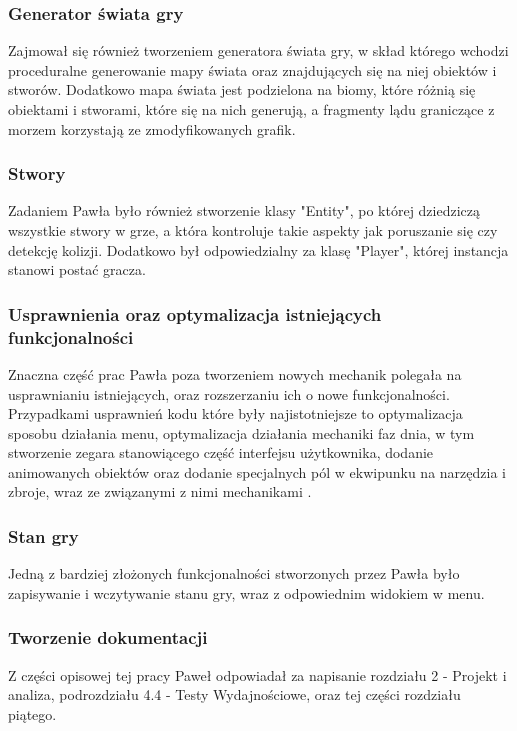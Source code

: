\documentclass{article}
\begin{document}
\subsubsection{Generator świata gry}
Zajmował się również tworzeniem generatora świata gry, w skład którego wchodzi proceduralne generowanie mapy świata oraz znajdujących się na niej obiektów i stworów. Dodatkowo mapa świata jest podzielona na biomy, które różnią się obiektami i stworami, które się na nich generują, a fragmenty lądu graniczące z morzem korzystają ze zmodyfikowanych grafik.

\subsubsection{Stwory}
Zadaniem Pawła było również stworzenie klasy "Entity", po której dziedziczą wszystkie stwory w grze, a która kontroluje takie aspekty jak poruszanie się czy detekcję kolizji. Dodatkowo był odpowiedzialny za klasę "Player", której instancja stanowi postać gracza.

\subsubsection{Usprawnienia oraz optymalizacja istniejących funkcjonalności}
Znaczna część prac Pawła poza tworzeniem nowych mechanik polegała na usprawnianiu istniejących, oraz rozszerzaniu ich o nowe funkcjonalności. Przypadkami usprawnień kodu które były najistotniejsze to optymalizacja sposobu działania menu, optymalizacja działania mechaniki faz dnia, w tym stworzenie zegara stanowiącego część interfejsu użytkownika, dodanie animowanych obiektów oraz dodanie specjalnych pól w ekwipunku na narzędzia i zbroje, wraz ze związanymi z nimi mechanikami .

\subsubsection{Stan gry}
Jedną z bardziej złożonych funkcjonalności stworzonych przez Pawła było zapisywanie i wczytywanie stanu gry, wraz z odpowiednim widokiem w menu.

\subsubsection{Tworzenie dokumentacji}
Z części opisowej tej pracy Paweł odpowiadał za napisanie rozdziału 2 - Projekt i analiza, podrozdziału 4.4 - Testy Wydajnościowe, oraz tej części rozdziału piątego.
\end{document}

